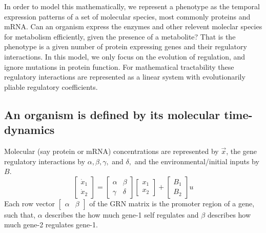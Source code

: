 \documentclass[11 pt]{article}
\newcommand{\1}{\mathbbm{1}}
\begin{document}
  In order to model this mathematically, we represent a phenotype as the temporal expression patterns of a set of molecular species, most commonly proteins and mRNA. Can an organism express the enzymes and other relevent moleclar species for metabolism efficiently, given the presence of a metabolite? That is the phenotype is a given number of protein expressing genes and their regulatory interactions. In this model, we only focus on the evolution of regulation, and ignore mutations in protein function. For mathematical tractability these regulatory interactions are represented as a linear system with evolutionarily pliable regulatory coefficients.

  \subsection{An organism is defined by its molecular time-dynamics}
   Molecular (say protein or mRNA) concentrations are represented by $\vec{x}$, the gene regulatory interactions by $\alpha, \beta, \gamma,$ and $\delta,$ and the environmental/initial inputs by $B$.  
      \begin{equation*}
        \begin{bmatrix} \dot{x}_{1} \\ \dot{x}_{2} \end{bmatrix} = \begin{bmatrix} \alpha & \beta \\ \gamma & \delta \end{bmatrix} \begin{bmatrix} x_{1} \\ x_{2} \end{bmatrix} + \begin{bmatrix} B_{1} \\ B_{2} \end{bmatrix} u
      \end{equation*}
    Each row vector $\begin{bmatrix} \alpha & \beta \end{bmatrix}$ of the GRN matrix is the promoter region of a gene, such that, $\alpha$ describes the how much gene-1 self regulates and $\beta$ describes how much gene-2 regulates gene-1. 
\end{document}
